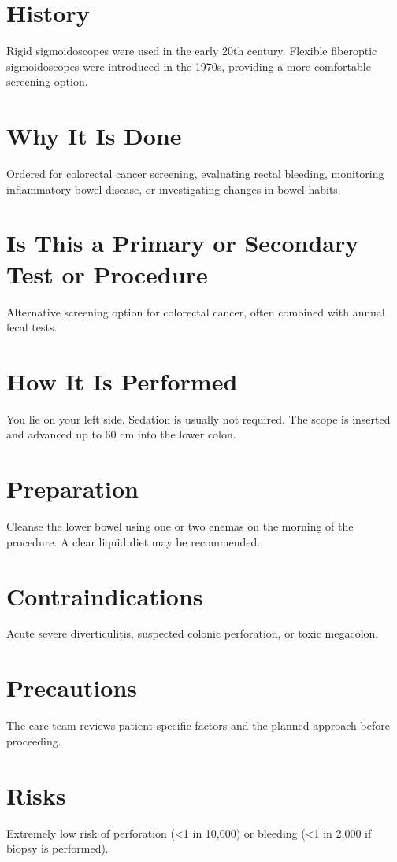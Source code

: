 \section*{History}
Rigid sigmoidoscopes were used in the early 20th century. Flexible fiberoptic sigmoidoscopes were introduced in the 1970s, providing a more comfortable screening option.

\section*{Why It Is Done}
Ordered for colorectal cancer screening, evaluating rectal bleeding, monitoring inflammatory bowel disease, or investigating changes in bowel habits.

\section*{Is This a Primary or Secondary Test or Procedure}
Alternative screening option for colorectal cancer, often combined with annual fecal tests.

\section*{How It Is Performed}
You lie on your left side. Sedation is usually not required. The scope is inserted and advanced up to 60 cm into the lower colon.

\section*{Preparation}
Cleanse the lower bowel using one or two enemas on the morning of the procedure. A clear liquid diet may be recommended.

\section*{Contraindications}
Acute severe diverticulitis, suspected colonic perforation, or toxic megacolon.

\section*{Precautions}
The care team reviews patient-specific factors and the planned approach before proceeding.

\section*{Risks}
Extremely low risk of perforation (<1 in 10,000) or bleeding (<1 in 2,000 if biopsy is performed).

